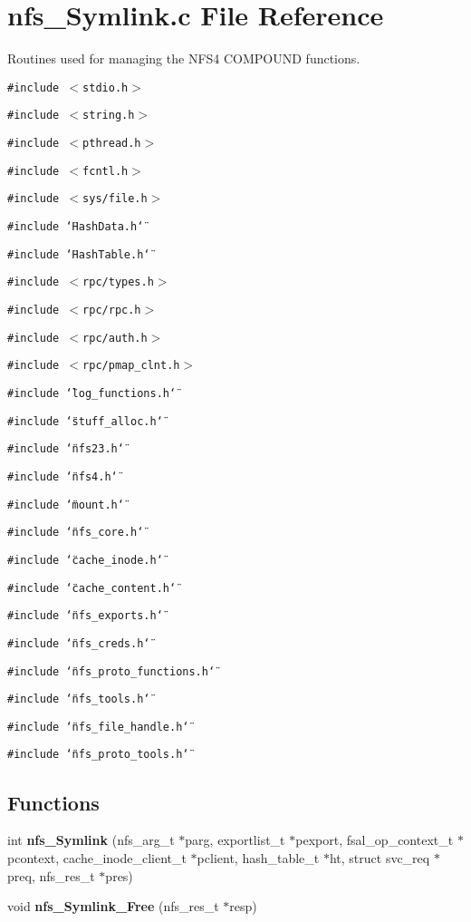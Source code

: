 \section{nfs\_\-Symlink.c File Reference}
\label{nfs__Symlink_8c}
Routines used for managing the NFS4 COMPOUND functions. 

{\tt \#include $<$stdio.h$>$}\par
{\tt \#include $<$string.h$>$}\par
{\tt \#include $<$pthread.h$>$}\par
{\tt \#include $<$fcntl.h$>$}\par
{\tt \#include $<$sys/file.h$>$}\par
{\tt \#include \char`\"{}Hash\-Data.h\char`\"{}}\par
{\tt \#include \char`\"{}Hash\-Table.h\char`\"{}}\par
{\tt \#include $<$rpc/types.h$>$}\par
{\tt \#include $<$rpc/rpc.h$>$}\par
{\tt \#include $<$rpc/auth.h$>$}\par
{\tt \#include $<$rpc/pmap\_\-clnt.h$>$}\par
{\tt \#include \char`\"{}log\_\-functions.h\char`\"{}}\par
{\tt \#include \char`\"{}stuff\_\-alloc.h\char`\"{}}\par
{\tt \#include \char`\"{}nfs23.h\char`\"{}}\par
{\tt \#include \char`\"{}nfs4.h\char`\"{}}\par
{\tt \#include \char`\"{}mount.h\char`\"{}}\par
{\tt \#include \char`\"{}nfs\_\-core.h\char`\"{}}\par
{\tt \#include \char`\"{}cache\_\-inode.h\char`\"{}}\par
{\tt \#include \char`\"{}cache\_\-content.h\char`\"{}}\par
{\tt \#include \char`\"{}nfs\_\-exports.h\char`\"{}}\par
{\tt \#include \char`\"{}nfs\_\-creds.h\char`\"{}}\par
{\tt \#include \char`\"{}nfs\_\-proto\_\-functions.h\char`\"{}}\par
{\tt \#include \char`\"{}nfs\_\-tools.h\char`\"{}}\par
{\tt \#include \char`\"{}nfs\_\-file\_\-handle.h\char`\"{}}\par
{\tt \#include \char`\"{}nfs\_\-proto\_\-tools.h\char`\"{}}\par
\subsection*{Functions}
\begin{CompactItemize}
\item 
int {\bf nfs\_\-Symlink} (nfs\_\-arg\_\-t $\ast$parg, exportlist\_\-t $\ast$pexport, fsal\_\-op\_\-context\_\-t $\ast$pcontext, cache\_\-inode\_\-client\_\-t $\ast$pclient, hash\_\-table\_\-t $\ast$ht, struct svc\_\-req $\ast$preq, nfs\_\-res\_\-t $\ast$pres)
\item 
void {\bf nfs\_\-Symlink\_\-Free} (nfs\_\-res\_\-t $\ast$resp)
\end{CompactItemize}


